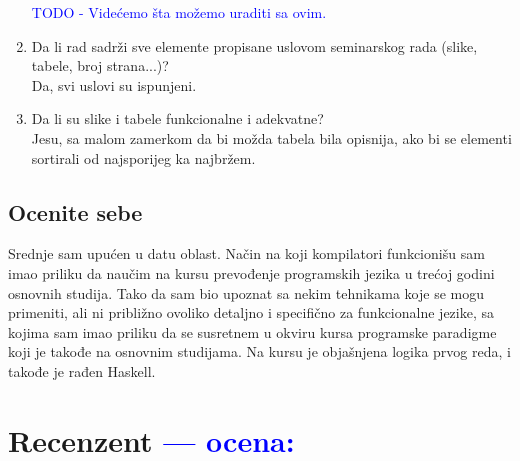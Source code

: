 \documentclass[a4paper]{report}
\newcommand{\odgovor}[1]{\textcolor{blue}{#1}}
\begin{document}
\begin{enumerate}
	\odgovor{TODO - Videćemo šta možemo uraditi sa ovim.}
	
\item Da li rad sadrži sve elemente propisane uslovom seminarskog rada (slike, tabele, broj strana...)?\\
	Da, svi uslovi su ispunjeni.
	
\item Da li su slike i tabele funkcionalne i adekvatne?\\
	Jesu, sa malom zamerkom da bi možda tabela bila opisnija, ako bi se elementi sortirali od najsporijeg ka najbržem.
	
\end{enumerate}

\section{Ocenite sebe}

Srednje sam upućen u datu oblast. Način na koji kompilatori funkcionišu sam imao priliku da naučim na kursu prevođenje programskih jezika u trećoj godini osnovnih studija. Tako da sam bio upoznat sa nekim tehnikama koje se mogu primeniti, ali ni približno ovoliko detaljno i specifično za funkcionalne jezike, sa kojima sam imao priliku da se susretnem u okviru kursa programske paradigme koji je takođe na osnovnim studijama. Na kursu je objašnjena logika prvog reda, i takođe je rađen Haskell.

\chapter{Recenzent \odgovor{--- ocena:} }
\end{document}
